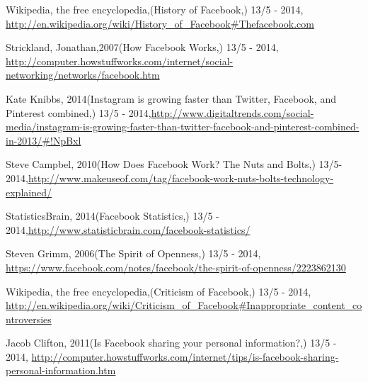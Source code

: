\documentclass[conference]{IEEEtran}
\begin{document}
\begin{thebibliography}{1}


Wikipedia, the free encyclopedia,(History of Facebook,) 13/5 - 2014,
\href{http://en.wikipedia.org/wiki/History\_of\_Facebook\#Thefacebook.com}{http://en.wikipedia.org/wiki/History\_of\_Facebook\#Thefacebook.com}

Strickland, Jonathan,2007(How Facebook Works,) 13/5 - 2014,
\href{http://computer.howstuffworks.com/internet/social-networking/networks/facebook.htm}{http://computer.howstuffworks.com/internet/social-networking/networks/facebook.htm}

Kate Knibbs,
2014(Instagram is growing faster than Twitter, Facebook, and Pinterest combined,) 13/5 - 2014,\href{http://www.digitaltrends.com/social-media/instagram-is-growing-faster-than-twitter-facebook-and-pinterest-combined-in-2013/\#!NpBxl}{http://www.digitaltrends.com/social-media/instagram-is-growing-faster-than-twitter-facebook-and-pinterest-combined-in-2013/\#!NpBxl}

Steve Campbel,
 2010(How Does Facebook Work? The Nuts and Bolts,) 13/5-2014,\href{http://www.makeuseof.com/tag/facebook-work-nuts-bolts-technology-explained/}{http://www.makeuseof.com/tag/facebook-work-nuts-bolts-technology-explained/}

StatisticsBrain,
2014(Facebook Statistics,) 13/5 - 2014,\href{http://www.statisticbrain.com/facebook-statistics/}{http://www.statisticbrain.com/facebook-statistics/}

Steven Grimm, 2006(The Spirit of Openness,) 13/5 - 2014, \href{https://www.facebook.com/notes/facebook/the-spirit-of-openness/2223862130}{https://www.facebook.com/notes/facebook/the-spirit-of-openness/2223862130}


Wikipedia, the free encyclopedia,(Criticism of Facebook,) 13/5 - 2014, \href{http://en.wikipedia.org/wiki/Criticism\_of\_Facebook\#Inappropriate\_content\_controversies}{http://en.wikipedia.org/wiki/Criticism\_of\_Facebook\#Inappropriate\_content\_controversies}

Jacob Clifton, 2011(Is Facebook sharing your personal information?,) 13/5 - 2014, \href{http://computer.howstuffworks.com/internet/tips/is-facebook-sharing-personal-information.htm}{http://computer.howstuffworks.com/internet/tips/is-facebook-sharing-personal-information.htm}


\end{thebibliography}
\end{document}
